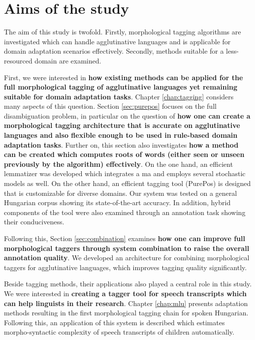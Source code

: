 \section{Aims of the study}

The aim of this study is twofold. 
Firstly, morphological tagging algorithms are investigated which can handle agglutinative languages and is applicable for domain adaptation scenarios effectively. 
Secondly, methods suitable for a less-resourced domain are examined.

First, we were interested in \textbf{how existing methods can be applied for the full morphological tagging of agglutinative languages yet remaining suitable for domain adaptation tasks}. 
Chapter \ref{chap:tagging} considers many aspects of this question. 
Section \ref{sec:purepos} focuses on the full disambiguation problem, in particular on the question of \textbf{how one can create a morphological tagging architecture that is accurate on agglutinative languages and also flexible enough to be used in rule-based domain adaptation tasks}.
Further on,  this section also investigates \textbf{how a method can be created which computes roots of words (either seen or unseen previously by the algorithm) effectively}. 
On the one hand, an efficient lemmatizer was developed which integrates a \gls{ma} and employs several stochastic models as well. %
On the other hand, an efficient tagging tool (PurePos) is designed that is customizable for diverse domains.
Our system was tested on a general Hungarian corpus showing its state-of-the-art accuracy. 
In addition, hybrid components of the tool were also examined through an annotation task showing their conduciveness.


Following this, Section \ref{sec:combination} examines \textbf{how one can improve full morphological taggers through system combination to raise the overall annotation quality}.
We developed an architecture for combining morphological taggers for agglutinative languages, which improves tagging quality significantly.


Beside tagging methods, their applications also played a central role in this study.
We were interested in \textbf{creating a tagger tool for speech transcripts which can help linguists in their research}.
Chapter \ref{chap:mlu} presents adaptation methods resulting in the first morphological tagging chain for spoken Hungarian.
Following this, an application of this system is described which estimates morpho-syntactic complexity of speech transcripts of children automatically.

